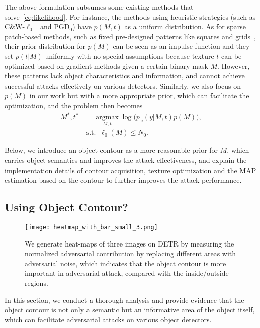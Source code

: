 \documentclass[times,twocolumn,final,authoryear]{elsarticle}
\begin{document}
The above formulation subsumes some existing methods that solve~\cref{eq:likelihood}. For instance, the methods using heuristic strategies (such as C\&W-$\ell_0$~\citep{carlini2017towards} and PGD$_0$\citep{croce2019sparse}) have $p(M,t)$ as a uniform distribution. As for sparse patch-based methods, such as fixed pre-designed patterns like squares and grids~\citep{liu2018dpatch,thys2019fooling,wu2020dpattack}, their prior distribution for $p(M)$ can be seen as an impulse function and they set $p(t|M)$ uniformly with no special assumptions because texture $t$ can be optimized based on gradient methods given a certain binary mask $M$. However, these patterns lack object characteristics and information, and cannot achieve successful attacks effectively on various detectors. Similarly, we also focus on $p(M)$ in our work but with a more appropriate prior, which can facilitate the optimization, and the problem then becomes
\begin{equation}
\begin{split}
    M^*, t^* &= \mathop{\arg\max}\limits_{M,t} \log\big(p_\omega(\bar{y}|M,t)p(M)\big),\\
    &\operatorname{ s.t. }\;\ell_0(M)\leq N_0.
\end{split}
\label{eq:map}
\end{equation}

Below, we introduce an object contour as a more reasonable prior for $M$, which carries object semantics and improves the attack effectiveness, and explain the implementation details of contour acquisition, texture optimization and the MAP estimation based on the contour to further improves the attack performance.



\subsection{Using Object Contour?}

\begin{figure}[!t]
    \centering
    \texttt{[image: heatmap\_with\_bar\_small\_3.png]}
    \caption{
    We generate heat-maps of three images on DETR by measuring the normalized adversarial contribution by replacing  different areas with adversarial noise, which indicates that the object contour is more important in adversarial attack, compared with the inside/outside regions.
    \vspace{-2ex}
    }
    \label{fig:vis}
\end{figure}
In this section, we conduct a thorough analysis and provide evidence that the object contour is not only a semantic but an informative area of the object itself, which can facilitate adversarial attacks on various object detectors. 
\end{document}
